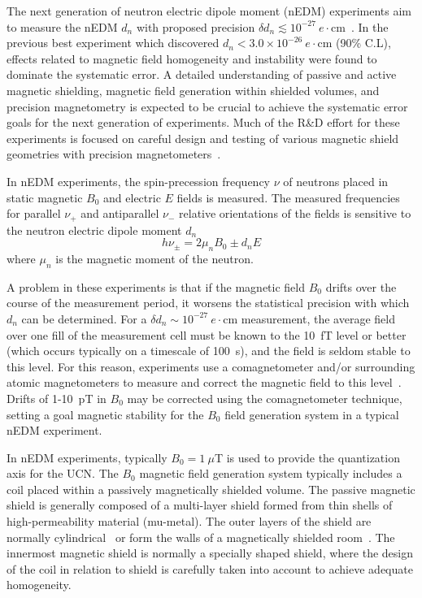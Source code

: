 \documentclass[review]{elsarticle}
\begin{document}
The next generation of neutron electric dipole moment (nEDM)
experiments aim to measure the nEDM $d_n$ with proposed precision
$\delta d_n\lesssim
10^{-27}~e\cdot$cm~\cite{bib:nedm2,bib:nedm2.5,bib:nedm3,bib:nedm3.5,bib:nedm5,bib:nedm6,bib:nedm6.5,bib:nedmtriumf}.
In the previous best experiment \cite{bib:baker,bib:pendlebury} which
discovered $d_n<3.0\times 10^{-26}~e\cdot$cm (90\% C.L), effects
related to magnetic field homogeneity and instability were found to
dominate the systematic error.  A detailed understanding of passive
and active magnetic shielding, magnetic field generation within
shielded volumes, and precision magnetometry is expected to be crucial
to achieve the systematic error goals for the next generation of
experiments.  Much of the R\&D effort for these experiments is focused
on careful design and testing of various magnetic shield geometries
with precision
magnetometers~\cite{bib:brys,bib:afach,bib:fierlingerroom,bib:sturmthesis,bib:patton}.

In nEDM experiments, the spin-precession frequency $\nu$ of neutrons
placed in static magnetic $B_0$ and electric $E$ fields is measured.
The measured frequencies for parallel $\nu_+$ and antiparallel $\nu_-$
relative orientations of the fields is sensitive to the neutron
electric dipole moment $d_n$
\begin{equation}
h\nu_\pm=2\mu_nB_0\pm d_nE
\end{equation}
where $\mu_n$ is the magnetic moment of the neutron.

A problem in these experiments is that if the magnetic field $B_0$
drifts over the course of the measurement period, it worsens the
statistical precision with which $d_n$ can be determined.  For a
$\delta d_n\sim 10^{-27}~e\cdot$cm measurement, the average field over
one fill of the measurement cell must be known to the 10~fT level or
better (which occurs typically on a timescale of 100~s), and the field
is seldom stable to this level.  For this reason, experiments use a
comagnetometer and/or surrounding atomic magnetometers to measure and
correct the magnetic field to this
level~\cite{bib:baker,bib:brys,bib:afach}.  Drifts of 1-10~pT in $B_0$
may be corrected using the comagnetometer technique, setting a goal
magnetic stability for the $B_0$ field generation system in a typical
nEDM experiment.

In nEDM experiments, typically $B_0=1~\mu$T is used to provide the
quantization axis for the UCN.  The $B_0$ magnetic field generation
system typically includes a coil placed within a passively
magnetically shielded volume.  The passive magnetic shield is
generally composed of a multi-layer shield formed from thin shells of
high-permeability material (mu-metal).  The outer layers of the shield
are normally cylindrical~\cite{bib:nedm2,bib:nedm3.5} or form the
walls of a magnetically shielded
room~\cite{bib:altarev2014,bib:altarev2015}.  The innermost magnetic
shield is normally a specially shaped shield, where the design of the
coil in relation to shield is carefully taken into account to achieve
adequate homogeneity.
\end{document}
